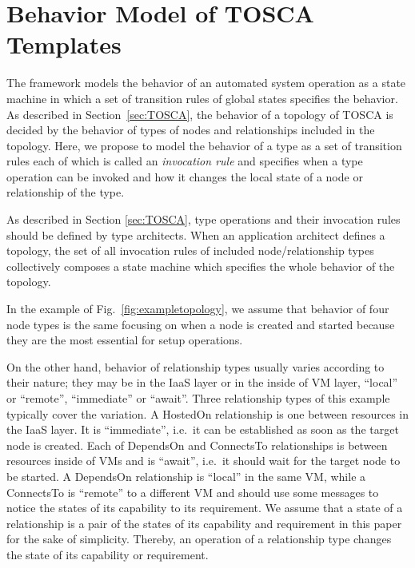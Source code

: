 \documentclass[12pt]{report}
\begin{document}
\section{Behavior Model of TOSCA Templates}
\label{sec:TOSCAbehavior}
The framework models the behavior of an automated system operation as a state
machine in which a set of transition rules of global states specifies the
behavior. As described in Section~\ref{sec:TOSCA}, the behavior of a
topology of TOSCA is decided by the behavior of types of nodes and
relationships included in the topology. Here, we propose to model the
behavior of a type as a set of transition rules each of which is
called an {\it invocation rule} and specifies when a type operation can
be invoked and how it changes the local state of a node or
relationship of the type.

As described in Section \ref{sec:TOSCA}, type operations and their
invocation rules should be defined by type architects. When an
application architect defines a topology, the set of all invocation
rules of included node/relationship types collectively composes a
state machine which specifies the whole behavior of the topology.

In the example of Fig.~\ref{fig:exampletopology}, we assume that
behavior of four node types is the same focusing on when a node is
created and started because they are the most essential for setup
operations.

On the other hand, behavior of relationship types usually varies
according to their nature; they may be in the IaaS layer or in the
inside of VM layer, ``local'' or ``remote'', ``immediate'' or
``await''. Three relationship types of this example typically cover
the variation. A HostedOn relationship is one between resources in the
IaaS layer.  It is ``immediate'', i.e.\ it can be established as soon
as the target node is created.  Each of DependsOn and ConnectsTo
relationships is between resources inside of VMs and is ``await'',
i.e.\ it should wait for the target node to be started. A DependsOn
relationship is ``local'' in the same VM, while a ConnectsTo is
``remote'' to a different VM and should use some messages to notice
the states of its capability to its requirement. We assume that a
state of a relationship is a pair of the states of its capability and
requirement in this paper for the sake of simplicity. Thereby, an
operation of a relationship type changes the state of its capability
or requirement.
\end{document}
